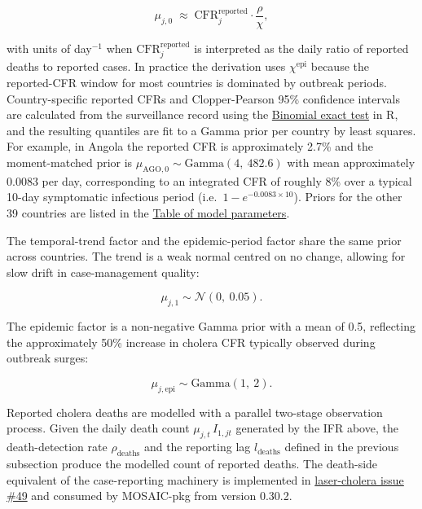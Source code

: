\documentclass[
]{book}
\begin{document}
\[
\mu_{j,0} \;\approx\; \text{CFR}^{\text{reported}}_{j} \cdot \frac{\rho}{\chi},
\label{eq:mu-baseline-derivation}
\]

with units of day\(^{-1}\) when \(\text{CFR}^{\text{reported}}_{j}\) is interpreted as the daily ratio of reported deaths to reported cases. In practice the derivation uses \(\chi^{\text{epi}}\) because the reported-CFR window for most countries is dominated by outbreak periods. Country-specific reported CFRs and Clopper-Pearson 95\% confidence intervals are calculated from the surveillance record using the \href{https://www.rdocumentation.org/packages/stats/versions/3.6.2/topics/binom.test}{Binomial exact test} in R, and the resulting quantiles are fit to a Gamma prior per country by least squares. For example, in Angola the reported CFR is approximately 2.7\% and the moment-matched prior is \(\mu_{\text{AGO},0} \sim \text{Gamma}(4,\ 482.6)\) with mean approximately 0.0083 per day, corresponding to an integrated CFR of roughly 8\% over a typical 10-day symptomatic infectious period (i.e.~\(1 - e^{-0.0083 \times 10}\)). Priors for the other 39 countries are listed in the \hyperref[parameters-table]{Table of model parameters}.

The temporal-trend factor and the epidemic-period factor share the same prior across countries. The trend is a weak normal centred on no change, allowing for slow drift in case-management quality:

\[
\mu_{j,1} \sim \mathcal{N}(0,\ 0.05).
\]

The epidemic factor is a non-negative Gamma prior with a mean of 0.5, reflecting the approximately 50\% increase in cholera CFR typically observed during outbreak surges:

\[
\mu_{j,\text{epi}} \sim \text{Gamma}(1,\ 2).
\]

Reported cholera deaths are modelled with a parallel two-stage observation process. Given the daily death count \(\mu_{j,t}\,I_{1,jt}\) generated by the IFR above, the death-detection rate \(\rho_{\text{deaths}}\) and the reporting lag \(l_{\text{deaths}}\) defined in the previous subsection produce the modelled count of reported deaths. The death-side equivalent of the case-reporting machinery is implemented in \href{https://github.com/InstituteforDiseaseModeling/laser-cholera/issues/49}{laser-cholera issue \#49} and consumed by MOSAIC-pkg from version 0.30.2.
\end{document}
